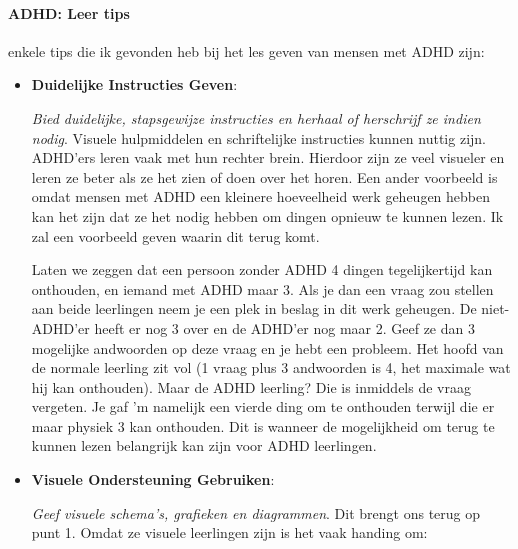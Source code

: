 \documentclass{article}
\begin{document}
                \bigskip\noindent\paragraph{ADHD: Leer tips}

                    enkele tips die ik gevonden heb bij het les geven van mensen met ADHD zijn:
                    
                    \begin{itemize}

                        \item \textbf{Duidelijke Instructies Geven}: 
                            
                            \textit{Bied duidelijke, stapsgewijze instructies en herhaal of herschrijf ze indien nodig}. Visuele hulpmiddelen en schriftelijke instructies kunnen nuttig zijn\cite{ADHD-visual}. ADHD'ers leren vaak met hun rechter brein. Hierdoor zijn ze veel visueler en leren ze beter als ze het zien of doen over het horen. Een ander voorbeeld is omdat mensen met ADHD een kleinere hoeveelheid werk geheugen hebben kan het zijn dat ze het nodig hebben om dingen opnieuw te kunnen lezen. Ik zal een voorbeeld geven waarin dit terug komt. 
                            
                            Laten we zeggen dat een persoon zonder ADHD 4 dingen tegelijkertijd kan onthouden, en iemand met ADHD maar 3. Als je dan een vraag zou stellen aan beide leerlingen neem je een plek in beslag in dit werk geheugen. De niet-ADHD'er heeft er nog 3 over en de ADHD'er nog maar 2. Geef ze dan 3 mogelijke andwoorden op deze vraag en je hebt een probleem. Het hoofd van de normale leerling zit vol (1 vraag plus 3 andwoorden is 4, het maximale wat hij kan onthouden). Maar de ADHD leerling? Die is inmiddels de vraag vergeten. Je gaf 'm namelijk een vierde ding om te onthouden terwijl die er maar physiek 3 kan onthouden. Dit is wanneer de mogelijkheid om terug te kunnen lezen belangrijk kan zijn voor ADHD leerlingen.\cite{ADHD-video-working-memory}

                        \item \textbf{Visuele Ondersteuning Gebruiken}: 

                            \textit{Geef visuele schema's, grafieken en diagrammen}. Dit brengt ons terug op punt 1. Omdat ze visuele leerlingen zijn is het vaak handing om: 

                            \begin{itemize}
                                

\end{itemize}
\end{itemize}
\end{document}
